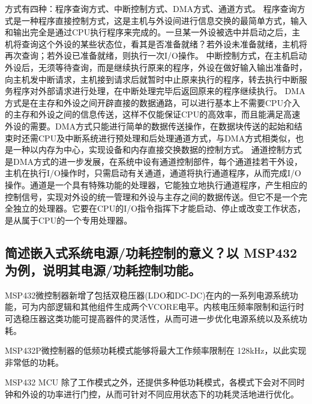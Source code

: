 \documentclass{article}
\begin{document}
方式有四种：程序查询方式、中断控制方式、DMA方式、通道方式。
程序查询方式是一种程序直接控制方式，这是主机与外设间进行信息交换的最简单方式，输入和输出完全是通过CPU执行程序来完成的。一旦某一外设被选中并启动之后，主机将查询这个外设的某些状态位，看其是否准备就绪？若外设未准备就绪，主机将再次查询；若外设已准备就绪，则执行一次I/O操作。 
中断控制方式，在主机启动外设后，无须等待查询，而是继续执行原来的程序，外设在做好输入输出准备时，向主机发中断请求，主机接到请求后就暂时中止原来执行的程序，转去执行中断服务程序对外部请求进行处理，在中断处理完毕后返回原来的程序继续执行。
DMA方式是在主存和外设之间开辟直接的数据通路，可以进行基本上不需要CPU介入的主存和外设之间的信息传送，这样不仅能保证CPU的高效率，而且能满足高速外设的需要。DMA方式只能进行简单的数据传送操作，在数据块传送的起始和结束时还需CPU及中断系统进行预处理和后处理通道方式，与DMA方式相类似，也是一种以内存为中心，实现设备和内存直接交换数据的控制方式。
通道控制方式是DMA方式的进一步发展，在系统中设有通道控制部件，每个通道挂若干外设，主机在执行I/O操作时，只需启动有关通道，通道将执行通道程序，从而完成I/O操作。通道是一个具有特殊功能的处理器，它能独立地执行通道程序，产生相应的控制信号，实现对外设的统一管理和外设与主存之间的数据传送。但它不是一个完全独立的处理器。它要在CPU的I/O指令指挥下才能启动、停止或改变工作状态，是从属于CPU的一个专用处理器。



\setcounter{subsection}{12}
\subsection{简述嵌入式系统电源/功耗控制的意义？以 MSP432 为例，说明其电源/功耗控制功能。}

MSP432微控制器新增了包括双稳压器(LDO和DC-DC)在内的一系列电源系统功能，可为内部逻辑和其他组件生成两个VCORE电平。内核电压频率限制和运行时可选稳压器这类功能可提高器件的灵活性，从而可进一步优化电源系统以及系统功耗。 

MSP432P微控制器的低频功耗模式能够将最大工作频率限制在 128kHz，以此实现非常低的功耗。

MSP432 MCU 除了工作模式之外，还提供多种低功耗模式，各模式下会对不同时钟和外设的功率进行门控，从而可针对不同应用状态下的功耗灵活地进行优化。
\end{document}
